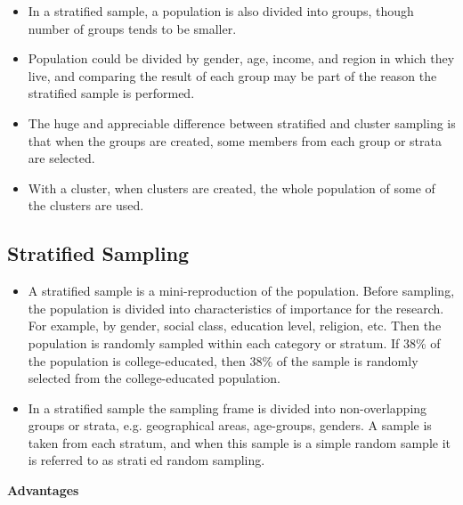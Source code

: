 ﻿\documentclass[]{report}
\begin{document}
\begin{itemize}
\item In a stratified sample, a population is also divided into groups, though number of groups tends to be smaller. \item Population could be divided by gender, age, income, and region in which they live, and comparing the result of each group may be part of the reason the stratified sample is performed. 
\end{itemize}


\begin{itemize}
\item The huge and appreciable difference between stratified and cluster sampling is that when the groups are created, some members from each group or strata are selected. 
\item With a cluster, when clusters are created, the whole population of some of the clusters are used. 
\end{itemize}



\subsection{Stratified Sampling}
\begin{itemize}
\item A stratified sample is a mini-reproduction of the population. Before sampling, the population is divided into characteristics of importance for the research. For example, by gender, social class, education level, religion, etc. Then the population is randomly sampled within each category or stratum. If 38\% of the population is college-educated, then 38\% of the sample is randomly selected from the college-educated population.

\item In a stratified sample the sampling frame is divided into non-overlapping groups or strata, e.g.
geographical areas, age-groups, genders. A sample is taken from each stratum, and when this
sample is a simple random sample it is referred to as stratied random sampling.
\end{itemize}
\normalsize

\noindent \textbf{Advantages}\\
\end{document}
